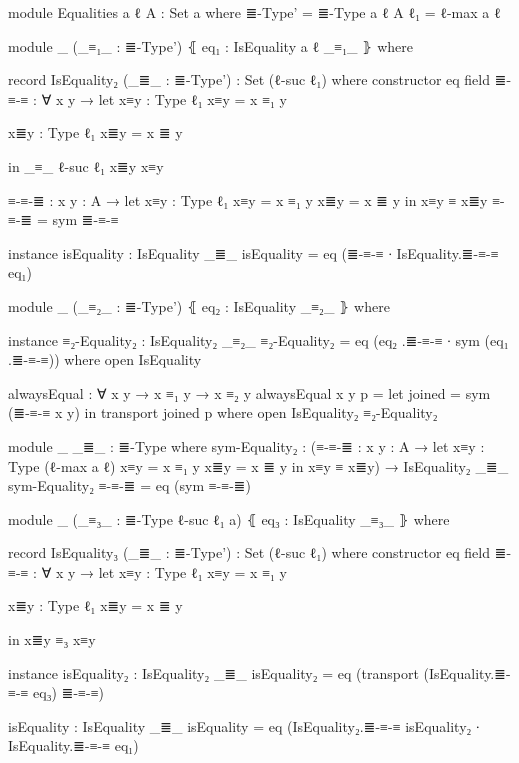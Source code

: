\documentclass{article}
\begin{document}
\begin{code}
module Equalities {a ℓ} {A : Set a} where
  ≣-Type' = ≣-Type {a} {ℓ} {A}
  ℓ₁ = ℓ-max a ℓ

  module _
    (_≡₁_ : ≣-Type')
    ⦃ eq₁ : IsEquality {a} {ℓ} _≡₁_ ⦄
    where

    record IsEquality₂ (_≣_ : ≣-Type') : Set (ℓ-suc ℓ₁) where
      constructor eq
      field
        ≣-≡-≡ : ∀ {x y} → let
          x≡y : Type ℓ₁
          x≡y = x ≡₁ y

          x≣y : Type ℓ₁
          x≣y = x ≣ y

          in _≡_ {ℓ-suc ℓ₁} x≣y x≡y

      ≡-≡-≣ : {x y : A} → let
        x≡y : Type ℓ₁
        x≡y = x ≡₁ y
        x≣y = x ≣ y
        in x≡y ≡ x≣y
      ≡-≡-≣ = sym ≣-≡-≡

      instance
        isEquality : IsEquality _≣_
        isEquality = eq (≣-≡-≡ ∙ IsEquality.≣-≡-≡ eq₁)

    module _
      (_≡₂_ : ≣-Type')
      ⦃ eq₂ : IsEquality _≡₂_ ⦄
      where

      instance
        ≡₂-Equality₂ : IsEquality₂ _≡₂_
        ≡₂-Equality₂ = eq (eq₂ .≣-≡-≡ ∙ sym (eq₁ .≣-≡-≡))
          where open IsEquality

      alwaysEqual : ∀ {x y} →  x ≡₁ y → x ≡₂ y
      alwaysEqual {x} {y} p =
        let joined = sym (≣-≡-≡ {x} {y})
        in transport joined p
        where open IsEquality₂ ≡₂-Equality₂

      module _ {_≣_ : ≣-Type} where
        sym-Equality₂ : (≡-≡-≣ : {x y : A} → let
          x≡y : Type (ℓ-max a ℓ)
          x≡y = x ≡₁ y
          x≣y = x ≣ y
          in x≡y ≡ x≣y)
          → IsEquality₂ _≣_
        sym-Equality₂ ≡-≡-≣ = eq (sym ≡-≡-≣)

    module _
      (_≡₃_ : ≣-Type {ℓ-suc ℓ₁} {a})
      ⦃ eq₃ : IsEquality _≡₃_ ⦄
      where

      record IsEquality₃ (_≣_ : ≣-Type') : Set (ℓ-suc ℓ₁) where
        constructor eq
        field
          ≣-≡-≡ : ∀ {x y} → let
            x≡y : Type ℓ₁
            x≡y = x ≡₁ y

            x≣y : Type ℓ₁
            x≣y = x ≣ y

            in x≣y ≡₃ x≡y

        instance
          isEquality₂ : IsEquality₂ _≣_
          isEquality₂ = eq (transport (IsEquality.≣-≡-≡ eq₃) ≣-≡-≡)

          isEquality : IsEquality _≣_
          isEquality = eq (IsEquality₂.≣-≡-≡ isEquality₂ ∙ IsEquality.≣-≡-≡ eq₁)


\end{code}
\end{document}
